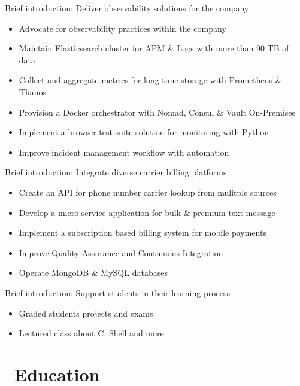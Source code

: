 \documentclass{resume}
\begin{document}
Brief introduction: Deliver observability solutions for the company
\begin{itemize}
  \item Advocate for observability practices within the company
  \item Maintain Elasticsearch cluster for APM \& Logs with more than 90 TB of data
  \item Collect and aggregate metrics for long time storage with Prometheus \& Thanos
  \item Provision a Docker orchestrator with Nomad, Consul \& Vault On-Premises
  \item Implement a browser test suite solution for monitoring with Python
  \item Improve incident management workflow with automation
\end{itemize}

Brief introduction: Integrate diverse carrier billing platforms
\begin{itemize}
  \item Create an API for phone number carrier lookup from mulitple sources
  \item Develop a micro-service application for bulk \& premium text message
  \item Implement a subscription based billing system for mobile payments
  \item Improve Quality Assurance and Continuous Integration
  \item Operate MongoDB \& MySQL databases
\end{itemize}

Brief introduction: Support students in their learning process
\begin{itemize}
  \item Graded students projects and exams
  \item Lectured class about C, Shell and more
\end{itemize}

\section{\texorpdfstring{\textbf{}\ Education}{Education}}
\end{document}
